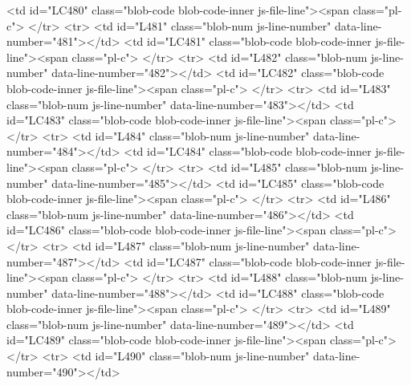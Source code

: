         <td id="LC480" class="blob-code blob-code-inner js-file-line"><span class="pl-c">%
      </tr>
      <tr>
        <td id="L481" class="blob-num js-line-number" data-line-number="481"></td>
        <td id="LC481" class="blob-code blob-code-inner js-file-line"><span class="pl-c">%
      </tr>
      <tr>
        <td id="L482" class="blob-num js-line-number" data-line-number="482"></td>
        <td id="LC482" class="blob-code blob-code-inner js-file-line"><span class="pl-c">%
      </tr>
      <tr>
        <td id="L483" class="blob-num js-line-number" data-line-number="483"></td>
        <td id="LC483" class="blob-code blob-code-inner js-file-line"><span class="pl-c">%
      </tr>
      <tr>
        <td id="L484" class="blob-num js-line-number" data-line-number="484"></td>
        <td id="LC484" class="blob-code blob-code-inner js-file-line"><span class="pl-c">%
      </tr>
      <tr>
        <td id="L485" class="blob-num js-line-number" data-line-number="485"></td>
        <td id="LC485" class="blob-code blob-code-inner js-file-line"><span class="pl-c">%
      </tr>
      <tr>
        <td id="L486" class="blob-num js-line-number" data-line-number="486"></td>
        <td id="LC486" class="blob-code blob-code-inner js-file-line"><span class="pl-c">%
      </tr>
      <tr>
        <td id="L487" class="blob-num js-line-number" data-line-number="487"></td>
        <td id="LC487" class="blob-code blob-code-inner js-file-line"><span class="pl-c">%
      </tr>
      <tr>
        <td id="L488" class="blob-num js-line-number" data-line-number="488"></td>
        <td id="LC488" class="blob-code blob-code-inner js-file-line"><span class="pl-c">%
      </tr>
      <tr>
        <td id="L489" class="blob-num js-line-number" data-line-number="489"></td>
        <td id="LC489" class="blob-code blob-code-inner js-file-line"><span class="pl-c">%
      </tr>
      <tr>
        <td id="L490" class="blob-num js-line-number" data-line-number="490"></td>

